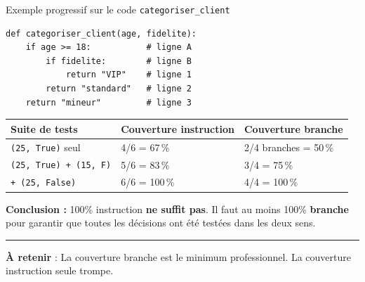 \documentclass[aspectratio=169,11pt]{beamer}
\newcommand{\takeaway}[1]{%
\vfill\begin{beamercolorbox}[wd=\linewidth,sep=0.4em]{}
\color{accent2}\rule[0.6ex]{1.2em}{1.2pt}\hspace{0.4em}%
\textbf{\color{accent2}\small À retenir} \textcolor{textsoft}{:} %
{\small\color{textmain}#1}
\end{beamercolorbox}}
\begin{document}
\begin{frame}[fragile,t,shrink=10]{Exemple progressif sur le code \texttt{categoriser\_client}}
\begin{lstlisting}[style=pythondark]
def categoriser_client(age, fidelite):
    if age >= 18:           # ligne A
        if fidelite:        # ligne B
            return "VIP"    # ligne 1
        return "standard"   # ligne 2
    return "mineur"         # ligne 3
\end{lstlisting}
\vspace{0.2cm}
\footnotesize
\begin{tabular}{@{}p{3.0cm} p{4.2cm} p{4.4cm}@{}}
\toprule
\textbf{Suite de tests} & \textbf{Couverture instruction} & \textbf{Couverture branche} \\
\midrule
\texttt{(25, True)} seul & 4/6 = 67\,\% & 2/4 branches = 50\,\% \\
\texttt{(25, True) + (15, F)} & 5/6 = 83\,\% & 3/4 = 75\,\% \\
\texttt{+ (25, False)} & 6/6 = 100\,\% & 4/4 = 100\,\% \\
\bottomrule
\end{tabular}
\vspace{0.4cm}

\textbf{Conclusion :} 100\% instruction \textbf{ne suffit pas}. Il faut au moins 100\% \textbf{branche} pour garantir que toutes les décisions ont été testées dans les deux sens.
\takeaway{La couverture branche est le minimum professionnel. La couverture instruction seule trompe.}
\end{frame}
\end{document}
